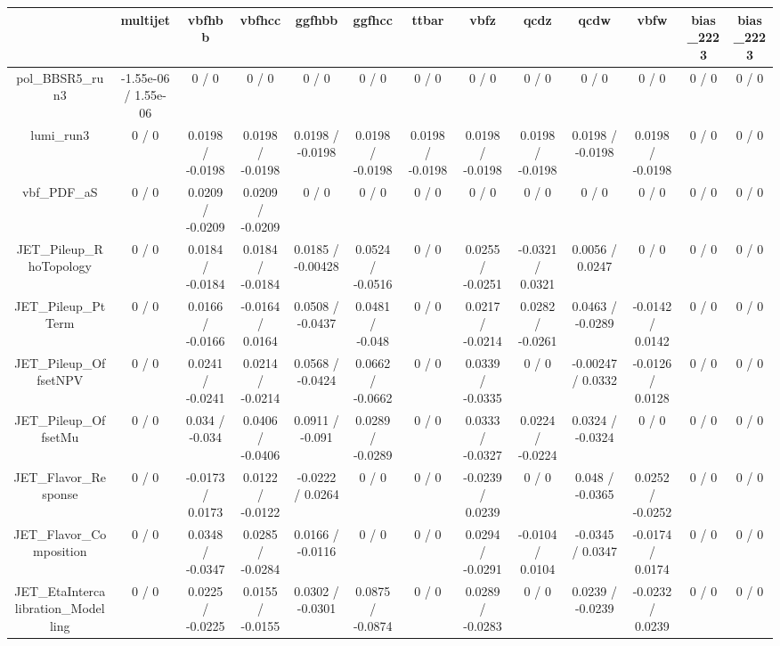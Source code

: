 \documentclass[10pt]{article}
\begin{document}
\begin{table}[htbp]
\begin{center}
\begin{tabular}{|c|c|c|c|c|c|c|c|c|c|c|c|c|}
\hline 
      & multijet      & vbfhbb      & vbfhcc      & ggfhbb      & ggfhcc      & ttbar      & vbfz      & qcdz      & qcdw      & vbfw      & bias_2223      & bias_2223 \\ 
\hline 
  pol_BBSR5_run3 & -1.55e-06 / 1.55e-06 & 0 / 0 & 0 / 0 & 0 / 0 & 0 / 0 & 0 / 0 & 0 / 0 & 0 / 0 & 0 / 0 & 0 / 0 & 0 / 0 & 0 / 0 \\ 
  lumi_run3 & 0 / 0 & 0.0198 / -0.0198 & 0.0198 / -0.0198 & 0.0198 / -0.0198 & 0.0198 / -0.0198 & 0.0198 / -0.0198 & 0.0198 / -0.0198 & 0.0198 / -0.0198 & 0.0198 / -0.0198 & 0.0198 / -0.0198 & 0 / 0 & 0 / 0 \\ 
  vbf_PDF_aS & 0 / 0 & 0.0209 / -0.0209 & 0.0209 / -0.0209 & 0 / 0 & 0 / 0 & 0 / 0 & 0 / 0 & 0 / 0 & 0 / 0 & 0 / 0 & 0 / 0 & 0 / 0 \\ 
  JET_Pileup_RhoTopology & 0 / 0 & 0.0184 / -0.0184 & 0.0184 / -0.0184 & 0.0185 / -0.00428 & 0.0524 / -0.0516 & 0 / 0 & 0.0255 / -0.0251 & -0.0321 / 0.0321 & 0.0056 / 0.0247 & 0 / 0 & 0 / 0 & 0 / 0 \\ 
  JET_Pileup_PtTerm & 0 / 0 & 0.0166 / -0.0166 & -0.0164 / 0.0164 & 0.0508 / -0.0437 & 0.0481 / -0.048 & 0 / 0 & 0.0217 / -0.0214 & 0.0282 / -0.0261 & 0.0463 / -0.0289 & -0.0142 / 0.0142 & 0 / 0 & 0 / 0 \\ 
  JET_Pileup_OffsetNPV & 0 / 0 & 0.0241 / -0.0241 & 0.0214 / -0.0214 & 0.0568 / -0.0424 & 0.0662 / -0.0662 & 0 / 0 & 0.0339 / -0.0335 & 0 / 0 & -0.00247 / 0.0332 & -0.0126 / 0.0128 & 0 / 0 & 0 / 0 \\ 
  JET_Pileup_OffsetMu & 0 / 0 & 0.034 / -0.034 & 0.0406 / -0.0406 & 0.0911 / -0.091 & 0.0289 / -0.0289 & 0 / 0 & 0.0333 / -0.0327 & 0.0224 / -0.0224 & 0.0324 / -0.0324 & 0 / 0 & 0 / 0 & 0 / 0 \\ 
  JET_Flavor_Response & 0 / 0 & -0.0173 / 0.0173 & 0.0122 / -0.0122 & -0.0222 / 0.0264 & 0 / 0 & 0 / 0 & -0.0239 / 0.0239 & 0 / 0 & 0.048 / -0.0365 & 0.0252 / -0.0252 & 0 / 0 & 0 / 0 \\ 
  JET_Flavor_Composition & 0 / 0 & 0.0348 / -0.0347 & 0.0285 / -0.0284 & 0.0166 / -0.0116 & 0 / 0 & 0 / 0 & 0.0294 / -0.0291 & -0.0104 / 0.0104 & -0.0345 / 0.0347 & -0.0174 / 0.0174 & 0 / 0 & 0 / 0 \\ 
  JET_EtaIntercalibration_Modelling & 0 / 0 & 0.0225 / -0.0225 & 0.0155 / -0.0155 & 0.0302 / -0.0301 & 0.0875 / -0.0874 & 0 / 0 & 0.0289 / -0.0283 & 0 / 0 & 0.0239 / -0.0239 & -0.0232 / 0.0239 & 0 / 0 & 0 / 0 \\ 

\end{tabular}
\end{center}
\end{table}
\end{document}
